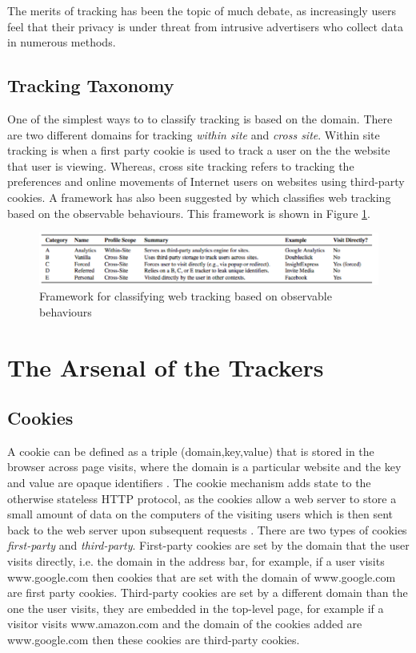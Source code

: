 \documentclass{article}
\begin{document}
The merits of tracking has been the topic of much debate, as increasingly users feel that their privacy is under threat from intrusive advertisers who collect data in numerous methods. 

\subsection{Tracking Taxonomy}
One of the simplest ways to to classify tracking is based on the domain. There are two different domains for tracking \textit{within site} and \textit{cross site}. Within site tracking is when a first party cookie is used to track a user on the the website that user is viewing. Whereas, cross site tracking refers to tracking the preferences and online movements of Internet users on websites using third-party cookies. A framework has also been suggested by  \parencite{roesner} which classifies web tracking based on the observable behaviours. This framework is shown in Figure \ref{fig:TAframework}. 

\begin{figure}[H]
    \centering
    \includegraphics[width=1\textwidth]{TAframework}
    \caption{Framework for classifying web tracking based on observable behaviours \parencite{roesner}}
    \label{fig:TAframework}
\end{figure}

\section{The Arsenal of the Trackers}

\subsection {Cookies} \label{cookies}
A cookie can be defined as a triple (domain,key,value) that is stored in the browser across page visits, where the domain is a particular website and the key and value are opaque identifiers \parencite{roesner}. The cookie mechanism adds state to the otherwise stateless HTTP protocol, as the cookies allow a web server to store a small amount of data on the computers of the visiting users which is then sent back to the web server upon subsequent requests \parencite{cookielessMonster}. There are two types of cookies \textit{first-party} and \textit{third-party}. First-party cookies are set by the domain that the user visits directly, i.e. the domain in the address bar, for example, if a user visits www.google.com then cookies that are set with the domain of www.google.com are first party cookies. Third-party cookies are set by a different domain than the one the user visits, they are embedded in the top-level page, for example if a visitor visits www.amazon.com and the domain of the cookies added are www.google.com then these cookies are third-party cookies. \newline
\end{document}
